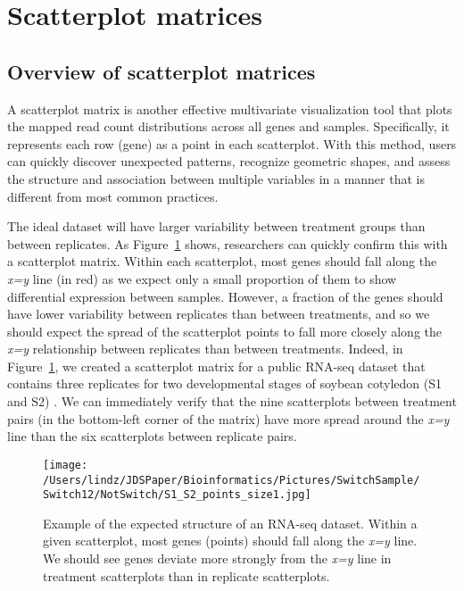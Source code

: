 \documentclass{bioinfo}
\begin{document}
\section{Scatterplot matrices}

\subsection{Overview of scatterplot matrices}

A scatterplot matrix is another effective multivariate visualization tool that plots the mapped read count distributions across all genes and samples. Specifically, it represents each row (gene) as a point in each scatterplot. With this method, users can quickly discover unexpected patterns, recognize geometric shapes, and assess the structure and association between multiple variables in a manner that is different from most common practices. 

The ideal dataset will have larger variability between treatment groups than between replicates. As Figure~\ref{cotyIdeal} shows, researchers can quickly confirm this with a scatterplot matrix. Within each scatterplot, most genes should fall along the \textit{x=y} line (in red) as we expect only a small proportion of them to show differential expression between samples. However, a fraction of the genes should have lower variability between replicates than between treatments, and so we should expect the spread of the scatterplot points to fall more closely along the \textit{x=y} relationship between replicates than between treatments. Indeed, in Figure~\ref{cotyIdeal}, we created a scatterplot matrix for a public RNA-seq dataset that contains three replicates for two developmental stages of soybean cotyledon (S1 and S2) \citep{Brown}. We can immediately verify that the nine scatterplots between treatment pairs (in the bottom-left corner of the matrix) have more spread around the \textit{x=y} line than the six scatterplots between replicate pairs.

\begin{figure}[!tpb]
\centerline{\texttt{[image: /Users/lindz/JDSPaper/Bioinformatics/Pictures/SwitchSample/Switch12/NotSwitch/S1\_S2\_points\_size1.jpg]}}
\caption{Example of the expected structure of an RNA-seq dataset. Within a given scatterplot, most genes (points) should fall along the \textit{x=y} line. We should see genes deviate more strongly from the \textit{x=y} line in treatment scatterplots than in replicate scatterplots. 
\label{cotyIdeal}}
\end{figure}
\end{document}
